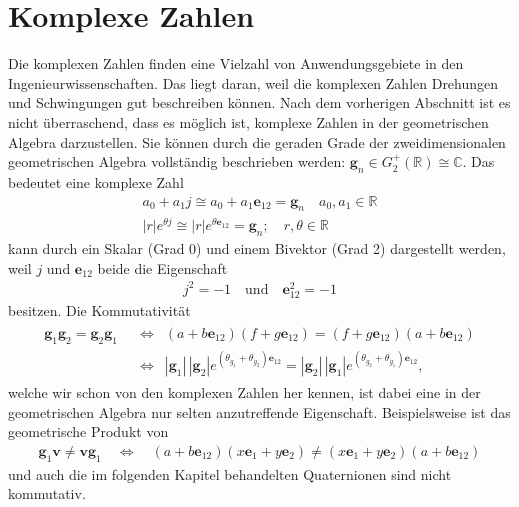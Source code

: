%
%
%
\section{Komplexe Zahlen}

Die komplexen Zahlen finden eine Vielzahl von Anwendungsgebiete in den Ingenieurwissenschaften. Das liegt daran, weil die komplexen Zahlen Drehungen und Schwingungen gut beschreiben können. Nach dem vorherigen Abschnitt ist es nicht überraschend, dass es möglich ist, komplexe Zahlen in der geometrischen Algebra darzustellen. Sie können durch die geraden Grade der zweidimensionalen geometrischen Algebra vollständig beschrieben werden: $\mathbf{g}_n \in G_2^+(\mathbb{R}) \cong \mathbb{C}$. Das bedeutet eine komplexe Zahl 
\begin{align}
a_0 + a_1 j \cong a_0 + a_1 \mathbf{e}_{12} = \mathbf{g}_n\quad a_0, a_1 \in \mathbb{R}\\
|r|e^{\theta j} \cong |r|e^{\theta \mathbf{e}_{12}} = \mathbf{g}_n; \quad r, \theta \in \mathbb{R}
\end{align}
kann durch ein Skalar (Grad 0) und einem Bivektor (Grad 2) dargestellt werden, weil $j$ und $\mathbf{e}_{12}$ beide die Eigenschaft
\begin{align}
j^2 = -1\quad\text{und}\quad\mathbf{e}_{12}^2 = -1
\end{align}
besitzen. Die Kommutativität
\begin{align}
\begin{split}
\mathbf{g}_1\mathbf{g}_2 = \mathbf{g}_2\mathbf{g}_1 \enspace&\Leftrightarrow\enspace (a + b \mathbf{e}_{12})(f + g \mathbf{e}_{12}) = (f + g \mathbf{e}_{12})(a + b \mathbf{e}_{12})\\ &\Leftrightarrow\enspace |\mathbf{g}_1|\,|\mathbf{g}_2|e^{(\theta_{g_1} + \theta_{g_2})\mathbf{e}_{12}} =  |\mathbf{g}_2|\,|\mathbf{g}_1|e^{(\theta_{g_2} + \theta_{g_1})\mathbf{e}_{12}},
\end{split}
\end{align}
welche wir schon von den komplexen Zahlen her kennen, ist dabei eine in der geometrischen Algebra nur selten anzutreffende Eigenschaft. Beispielsweise ist das geometrische Produkt von
\begin{align}
\mathbf{g}_1\mathbf{v}\not= \mathbf{v}\mathbf{g}_1 \quad\Leftrightarrow\quad(a + b \mathbf{e}_{12})(x\mathbf{e}_1+y\mathbf{e}_2)\not= (x\mathbf{e}_1+y\mathbf{e}_2)(a + b \mathbf{e}_{12})
\end{align}
und auch die im folgenden Kapitel behandelten Quaternionen sind nicht kommutativ.

